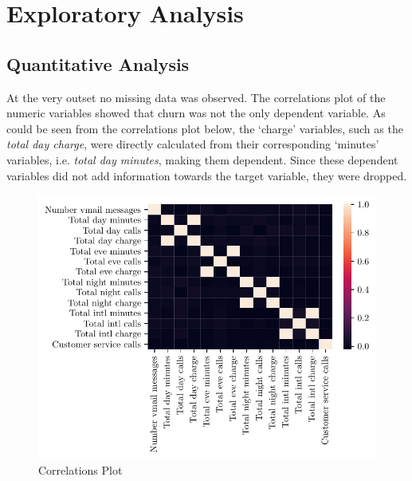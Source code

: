 \documentclass{article}
\begin{document}
\section{Exploratory Analysis}
\subsection{Quantitative Analysis}
At the very outset no missing data was observed. The correlations plot of the numeric variables showed that churn was not the only dependent variable. As could be seen from the correlations plot below, the `charge' variables, such as the \textit{total day charge}, were directly calculated from their corresponding `minutes' variables, i.e. \textit{total day minutes}, making them dependent. Since these dependent variables did not add information towards the target variable, they were dropped. 
\begin{figure}[H]
	\begin{center}
		\includegraphics[scale=0.80]{corr.pdf}
	\end{center}
	\caption{Correlations Plot}
\end{figure}
\end{document}
